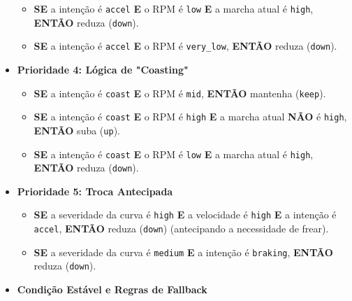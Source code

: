 \documentclass[12pt]{article}
\begin{document}
\begin{itemize}[label=\textbullet, leftmargin=*]
\begin{itemize}
        \item \textbf{SE} a intenção é \texttt{accel} \textbf{E} o RPM é \texttt{low} \textbf{E} a marcha atual é \texttt{high}, \textbf{ENTÃO} reduza (\texttt{down}).
        \item \textbf{SE} a intenção é \texttt{accel} \textbf{E} o RPM é \texttt{very\_low}, \textbf{ENTÃO} reduza (\texttt{down}).
    \end{itemize}
    \item \textbf{Prioridade 4: Lógica de "Coasting"}
    \begin{itemize}
        \item \textbf{SE} a intenção é \texttt{coast} \textbf{E} o RPM é \texttt{mid}, \textbf{ENTÃO} mantenha (\texttt{keep}).
        \item \textbf{SE} a intenção é \texttt{coast} \textbf{E} o RPM é \texttt{high} \textbf{E} a marcha atual \textbf{NÃO} é \texttt{high}, \textbf{ENTÃO} suba (\texttt{up}).
        \item \textbf{SE} a intenção é \texttt{coast} \textbf{E} o RPM é \texttt{low} \textbf{E} a marcha atual é \texttt{high}, \textbf{ENTÃO} reduza (\texttt{down}).
    \end{itemize}
    \item \textbf{Prioridade 5: Troca Antecipada}
    \begin{itemize}
        \item \textbf{SE} a severidade da curva é \texttt{high} \textbf{E} a velocidade é \texttt{high} \textbf{E} a intenção é \texttt{accel}, \textbf{ENTÃO} reduza (\texttt{down}) (antecipando a necessidade de frear).
        \item \textbf{SE} a severidade da curva é \texttt{medium} \textbf{E} a intenção é \texttt{braking}, \textbf{ENTÃO} reduza (\texttt{down}).
    \end{itemize}
    \item \textbf{Condição Estável e Regras de Fallback}


\end{itemize}
\end{document}
